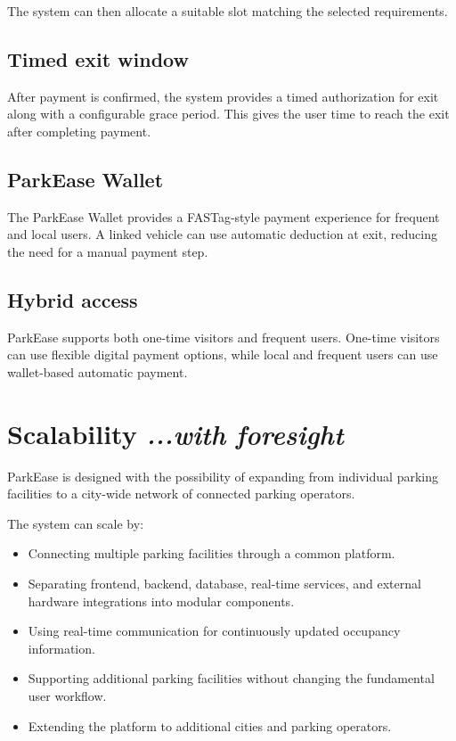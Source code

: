 \documentclass[12pt,a4paper]{article}
\begin{document}
The system can then allocate a suitable slot matching the selected requirements.

\subsection{Timed exit window}

After payment is confirmed, the system provides a timed authorization for exit along with a configurable grace period. This gives the user time to reach the exit after completing payment.

\subsection{ParkEase Wallet}

The ParkEase Wallet provides a FASTag-style payment experience for frequent and local users. A linked vehicle can use automatic deduction at exit, reducing the need for a manual payment step.

\subsection{Hybrid access}

ParkEase supports both one-time visitors and frequent users. One-time visitors can use flexible digital payment options, while local and frequent users can use wallet-based automatic payment.


\section{\textbf{Scalability}
\hfill
{\small\mdseries\itshape ...with foresight}}

ParkEase is designed with the possibility of expanding from individual parking facilities to a city-wide network of connected parking operators.

The system can scale by:

\begin{itemize}
    \item Connecting multiple parking facilities through a common platform.

    \item Separating frontend, backend, database, real-time services, and external hardware integrations into modular components.

    \item Using real-time communication for continuously updated occupancy information.

    \item Supporting additional parking facilities without changing the fundamental user workflow.

    \item Extending the platform to additional cities and parking operators.
\end{itemize}
\end{document}
